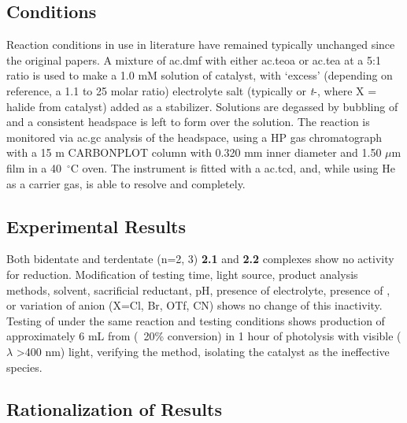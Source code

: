 \subsection{Conditions}

Reaction conditions in use in literature have remained typically unchanged since the original papers. A mixture of \gls{ac.dmf} with either \gls{ac.teoa} or \gls{ac.tea} at a 5:1 ratio is used to make a 1.0 mM solution of catalyst, with `excess' (depending on reference, a 1.1 to 25 molar ratio) electrolyte salt (typically  or \textit{t}-, where X = halide from catalyst) added as a stabilizer. Solutions are degassed by bubbling of  and a consistent headspace is left to form over the solution. The reaction is monitored via \gls{ac.gc} analysis of the headspace, using a HP gas chromatograph with a 15 m CARBONPLOT column with 0.320 mm inner diameter and 1.50 $\mu$m film in a 40~$^\circ$C oven. The instrument is fitted with a \gls{ac.tcd}, and, while using He as a carrier gas, is able to resolve  and  completely.  

\subsection{Experimental Results}

Both bidentate and terdentate  (n=2, 3) \textbf{2.1} and \textbf{2.2} complexes show no activity for  reduction. Modification of testing time, light source, product analysis methods, solvent, sacrificial reductant, pH, presence of electrolyte, presence of , or variation of anion (X=Cl, Br, OTf, CN) shows no change of this inactivity. Testing of  under the same reaction and testing conditions shows production of approximately 6 mL  from  (~20\% conversion) in 1 hour of photolysis with visible ($\lambda$ \textgreater 400 nm) light, verifying the method, isolating the catalyst as the ineffective species. 

\subsection{Rationalization of Results}\label{ss.rationalization}

